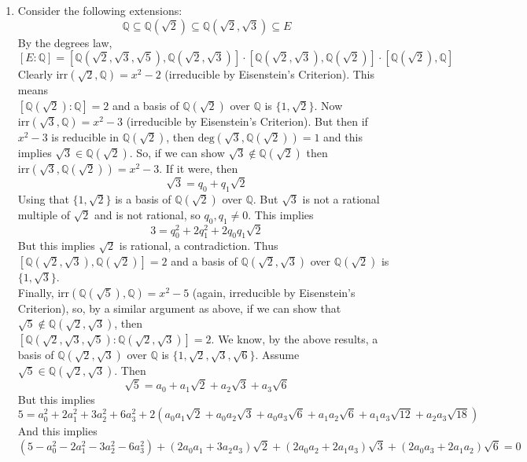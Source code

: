 \documentclass[11pt]{article}
\begin{document}
  \begin{enumerate}[label={(\alph*)}, left=16pt]
    \item Consider the following extensions: \[
    \mathbb{Q} \subseteq \mathbb{Q}(\sqrt{2}) \subseteq \mathbb{Q}(\sqrt{2}, \sqrt{3}) \subseteq E
    \]By the degrees law, \[
    [E: \mathbb{Q}] = [\mathbb{Q}(\sqrt{2}, \sqrt{3}, \sqrt{5}), \mathbb{Q}(\sqrt{2}, \sqrt{3})] \cdot [\mathbb{Q}(\sqrt{2}, \sqrt{3}), \mathbb{Q}(\sqrt{2})] \cdot [\mathbb{Q}(\sqrt{2}), \mathbb{Q}]
    \]
    Clearly $\text{irr}(\sqrt{2}, \mathbb{Q}) = x^2 - 2$ (irreducible by Eisenstein's Criterion). This means\\  $[\mathbb{Q}(\sqrt{2}): \mathbb{Q}] = 2$ and a basis of $\mathbb{Q}(\sqrt{2})$ over $\mathbb{Q}$ is $\{1, \sqrt{2}\}$. Now $\text{irr}(\sqrt{3}, \mathbb{Q}) = x^2 - 3$ (irreducible by Eisenstein's Criterion). But then if $x^2 - 3$ is reducible in $\mathbb{Q}(\sqrt{2})$, then $\text{deg}(\sqrt{3}, \mathbb{Q}(\sqrt{2})) = 1$ and this implies $\sqrt{3} \in \mathbb{Q}(\sqrt{2})$. So, if we can show $\sqrt{3} \notin \mathbb{Q}(\sqrt{2})$ then $\text{irr}(\sqrt{3}, \mathbb{Q}(\sqrt{2})) = x^2 - 3$. If it were, then \[
    \sqrt{3} = q_0 + q_1 \sqrt{2}
    \]
    Using that $\{1, \sqrt{2}\}$ is a basis of $\mathbb{Q}(\sqrt{2})$ over $\mathbb{Q}$.
    But $\sqrt{3}$ is not a rational multiple of $\sqrt{2}$ and is not rational, so $q_0,q_1 \ne 0$. This implies
    \[
    3 = q_0^2 + 2q_1^2 + 2q_0q_1\sqrt{2}
    \]
    But this implies $\sqrt{2}$ is rational, a contradiction. Thus $[\mathbb{Q}(\sqrt{2}, \sqrt{3}), \mathbb{Q}(\sqrt{2})] = 2$ and a basis of $\mathbb{Q}(\sqrt{2}, \sqrt{3})$ over $\mathbb{Q}(\sqrt{2})$ is $\{1,\sqrt{3}\}$. ~\\Finally, $\text{irr}(\mathbb{Q}(\sqrt{5}), \mathbb{Q}) = x^2 - 5$ (again, irreducible by Eisenstein's Criterion), so, by a similar argument as above, if we can show that $\sqrt{5} \notin \mathbb{Q}(\sqrt{2}, \sqrt{3})$, then \\ $[\mathbb{Q}(\sqrt{2}, \sqrt{3}, \sqrt{5}):\mathbb{Q}(\sqrt{2}, \sqrt{3})] = 2$. We know, by the above results, a basis of $\mathbb{Q}(\sqrt{2}, \sqrt{3})$ over $\mathbb{Q}$ is $\{1,\sqrt{2}, \sqrt{3}, \sqrt{6}\}$. Assume $\sqrt{5} \in \mathbb{Q}(\sqrt{2}, \sqrt{3})$. Then \[
    \sqrt{5} = a_0 + a_1\sqrt{2} + a_2 \sqrt{3} + a_3 \sqrt{6}
    \]
    But this implies \[
    5 = a_0^2 + 2a_1^2 + 3a_2^2 + 6a_3^2 + 2(a_0a_1 \sqrt{2} + a_0a_2\sqrt{3} + a_0a_3 \sqrt{6} + a_1a_2\sqrt{6} + a_1a_3\sqrt{12} +a_2a_3 \sqrt{18})
    \]
    And this implies \[
    (5-a_0^2 - 2a_1^2 - 3a_2^2 - 6a_3^2) + (2a_0a_1+3a_2a_3)\sqrt{2} + (2a_0a_2+2a_1a_3)\sqrt{3} + (2a_0a_3 + 2a_1a_2)\sqrt{6} = 0
\]
\end{enumerate}
\end{document}
